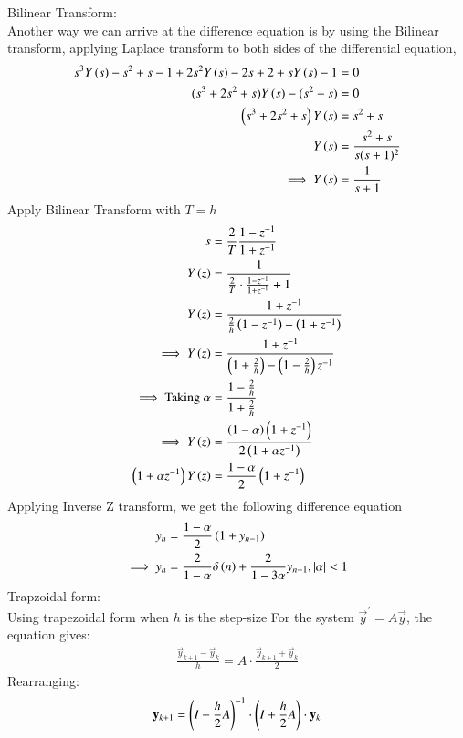 \documentclass[journal]{IEEEtran}
\begin{document}
Bilinear Transform:\\
Another way we can arrive at the difference equation is by using the Bilinear transform, applying Laplace transform to both sides of the differential equation,
\begin{align}
    s^3 Y\left(s\right) - s^2 + s - 1 + 2s^2 Y\left(s\right) - 2s + 2 + s Y\left(s\right) - 1 &= 0\\
    (s^3 + 2s^2 + s) Y\left(s\right) - (s^2 + s) &= 0\\
    \left(s^3 + 2s^2 + s\right) Y\left(s\right) &= s^2 + s \\
Y\left(s\right) &= \frac{s^2 + s}{s(s+1)^2}\\
\implies Y\left(s\right) &= \frac{1}{s + 1}
\end{align}
Apply Bilinear Transform with $T=h$
\begin{align}
    s&=\frac{2}{T}\frac{1-z^{-1}}{1+z^{-1}}\\
    Y\left(z\right)&=\frac{1}{\frac{2}{T}\cdot\frac{1-z^{-1}}{1+z^{-1}}+1}\\
    Y\left(z\right)&=\frac{1+z^{-1}}{\frac{2}{h}\left(1-z^{-1}\right)+\left(1+z^{-1}\right)}\\
    \implies Y\left(z\right)&=\frac{1+z^{-1}}{\left(1+\frac{2}{h}\right)-\left(1-\frac{2}{h}\right)z^{-1}}\\
    \implies \text{Taking }\alpha&=\frac{1-\frac{2}{h}}{1+\frac{2}{h}}\\
    \implies Y\left(z\right)&=\frac{\left(1-\alpha\right)\left(1+z^{-1}\right)}{2\left(1+\alpha z^{-1}\right)}\\
    \left(1+\alpha z^{-1}\right)Y\left(z\right)&=\frac{1-\alpha}{2}\left(1+z^{-1}\right)\\
\end{align}
Applying Inverse Z transform, we get the following difference equation
\begin{align}
    y_n&=\frac{1-\alpha}{2}\left(1+y_{n-1}\right)\\
    \implies y_n&=\frac{2}{1-\alpha}\delta\left(n\right)+\frac{2}{1-3\alpha}y_{n-1},\left\vert\alpha\right\vert<1
\end{align}
Trapzoidal form:\\
Using trapezoidal form when $h$ is the step-size For the system $\vec{y}^\prime=A\vec{y}$, the equation gives:
\begin{align}
    \frac{\vec{y}_{k+1}-\vec{y}_k}{h}=A\cdot\frac{\vec{y}_{k+1}+\vec{y}_{k}}{2}
\end{align}
Rearranging:
\begin{align}
    \mathbf{y}_{k+1}=\left(I-\frac{h}{2}A\right)^{-1}\cdot\left(I+\frac{h}{2}A\right)\cdot\mathbf{y}_k
\end{align}
\end{document}

